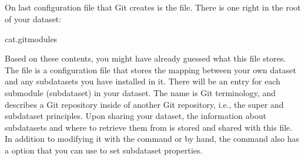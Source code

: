 \ignorespaces 

\subsection{}
\label{\detokenize{basics/101-123-config2:gitmodules}}\label{\detokenize{basics/101-123-config2:index-2}}
\sphinxAtStartPar
On last configuration file that Git creates is the  file.
There is one right in the root of your dataset:

\begin{sphinxVerbatim}[commandchars=\\\{\}]
cat.gitmodules
\end{sphinxVerbatim}

\sphinxAtStartPar
Based on these contents, you might have already guessed what this file
stores. The  file is a configuration file that stores the mapping between
your own dataset and any subdatasets you have installed in it.
There will be an entry for each submodule (subdataset) in your dataset.
The name  is Git terminology, and describes a Git repository inside of
another Git repository, i.e., the super\sphinxhyphen{} and subdataset principles.
Upon sharing your dataset, the information about subdatasets and where to retrieve
them from is stored and shared with this file.
In addition to modifying it with the  command or by hand, the  command also has a  option that you can use to set subdataset properties.

